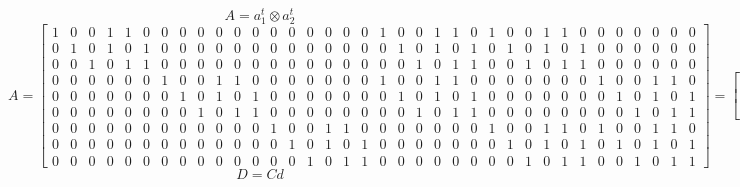 \documentclass{article}%
\begin{document}
\[%
A = a_1^t \otimes a_2^t%
\]%
\[%
A = \left[\begin{array}{cccccccccccccccccccccccccccccccccccc}1 & 0 & 0 & 1 & 1 & 0 & 0 & 0 & 0 & 0 & 0 & 0 & 0 & 0 & 0 & 0 & 0 & 0 & 1 & 0 & 0 & 1 & 1 & 0 & 1 & 0 & 0 & 1 & 1 & 0 & 0 & 0 & 0 & 0 & 0 & 0\\0 & 1 & 0 & 1 & 0 & 1 & 0 & 0 & 0 & 0 & 0 & 0 & 0 & 0 & 0 & 0 & 0 & 0 & 0 & 1 & 0 & 1 & 0 & 1 & 0 & 1 & 0 & 1 & 0 & 1 & 0 & 0 & 0 & 0 & 0 & 0\\0 & 0 & 1 & 0 & 1 & 1 & 0 & 0 & 0 & 0 & 0 & 0 & 0 & 0 & 0 & 0 & 0 & 0 & 0 & 0 & 1 & 0 & 1 & 1 & 0 & 0 & 1 & 0 & 1 & 1 & 0 & 0 & 0 & 0 & 0 & 0\\0 & 0 & 0 & 0 & 0 & 0 & 1 & 0 & 0 & 1 & 1 & 0 & 0 & 0 & 0 & 0 & 0 & 0 & 1 & 0 & 0 & 1 & 1 & 0 & 0 & 0 & 0 & 0 & 0 & 0 & 1 & 0 & 0 & 1 & 1 & 0\\0 & 0 & 0 & 0 & 0 & 0 & 0 & 1 & 0 & 1 & 0 & 1 & 0 & 0 & 0 & 0 & 0 & 0 & 0 & 1 & 0 & 1 & 0 & 1 & 0 & 0 & 0 & 0 & 0 & 0 & 0 & 1 & 0 & 1 & 0 & 1\\0 & 0 & 0 & 0 & 0 & 0 & 0 & 0 & 1 & 0 & 1 & 1 & 0 & 0 & 0 & 0 & 0 & 0 & 0 & 0 & 1 & 0 & 1 & 1 & 0 & 0 & 0 & 0 & 0 & 0 & 0 & 0 & 1 & 0 & 1 & 1\\0 & 0 & 0 & 0 & 0 & 0 & 0 & 0 & 0 & 0 & 0 & 0 & 1 & 0 & 0 & 1 & 1 & 0 & 0 & 0 & 0 & 0 & 0 & 0 & 1 & 0 & 0 & 1 & 1 & 0 & 1 & 0 & 0 & 1 & 1 & 0\\0 & 0 & 0 & 0 & 0 & 0 & 0 & 0 & 0 & 0 & 0 & 0 & 0 & 1 & 0 & 1 & 0 & 1 & 0 & 0 & 0 & 0 & 0 & 0 & 0 & 1 & 0 & 1 & 0 & 1 & 0 & 1 & 0 & 1 & 0 & 1\\0 & 0 & 0 & 0 & 0 & 0 & 0 & 0 & 0 & 0 & 0 & 0 & 0 & 0 & 1 & 0 & 1 & 1 & 0 & 0 & 0 & 0 & 0 & 0 & 0 & 0 & 1 & 0 & 1 & 1 & 0 & 0 & 1 & 0 & 1 & 1\end{array}\right] = \left[\begin{matrix}1 & 0 & 0 & 1 & 1 & 0\\0 & 1 & 0 & 1 & 0 & 1\\0 & 0 & 1 & 0 & 1 & 1\end{matrix}\right] \otimes \left[\begin{matrix}1 & 0 & 0 & 1 & 1 & 0\\0 & 1 & 0 & 1 & 0 & 1\\0 & 0 & 1 & 0 & 1 & 1\end{matrix}\right]%
\]%
\[%
D = Cd%
\]%
\end{document}

